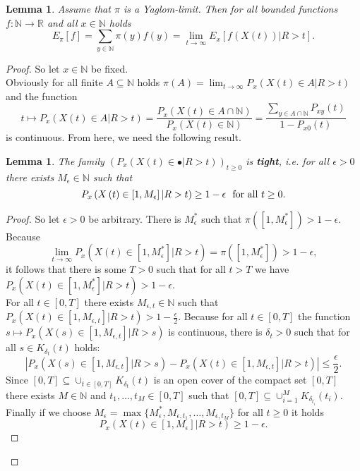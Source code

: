 \documentclass[12pt,a4paper]{scrartcl}
\newtheorem{lemma}[theorem]{Lemma}
\numberwithin{equation}{section}
\newcommand{\R}{\mathbb{R}} %
\newcommand{\N}{\mathbb{N}} %
\begin{document}
\begin{lemma} \label{extensionyaylom}
Assume that $\pi$ is a Yaglom-limit. Then for all bounded functions $f:\N \to \R$ and all $x \in \N$ holds
$$ E_{\pi}\left[f\right] = \sum_{y \in \N} \pi\left(y\right) f\left(y\right) = \lim_{t \to \infty} E_x\left[ f\left(X\left(t\right) \right) | R > t \right]. $$
\end{lemma}
\begin{proof}
So let $x \in \N$ be fixed.\\ 
Obviously for all finite $A \subseteq \N$ holds $\pi\left(A\right) = \lim_{t \to \infty} P_x\left(X\left(t\right) \in A | R > t \right)$ and the function
$$ t \mapsto P_x\left(X\left(t\right) \in A | R > t \right) = \frac{P_x\left(X\left(t\right) \in A \cap \N \right)}{P_x\left(X\left(t\right) \in \N \right)} = \frac{\sum_{y \in A \cap \N} P_{xy}\left(t\right) }{1-P_{x0}\left(t\right)}$$
is continuous. From here, we need the following result.
\begin{lemma}
The family $\left( P_x\left(X\left(t\right) \in \bullet | R > t \right) \right)_{t \geq 0}$ is \textbf{tight}, i.e. for all $\epsilon > 0$ there exists $ M_{\epsilon} \in \N $ such that
$$ P_x\left( X\left(t\right) \in \left[1, M_{\epsilon} \right] | R > t \right)  \geq 1 - \epsilon \ \ \textnormal{for all } t \geq 0.$$
\end{lemma}
\begin{proof}
So let $\epsilon > 0$ be arbitrary. There is $M_{\epsilon}^{\ast}$ such that $\pi\left(\left[1, M_{\epsilon}^{\ast}\right] \right) > 1 - \epsilon.$ Because 
$$ \lim_{t \to \infty} P_x\left(X\left(t\right) \in \left[1, M_{\epsilon}^{\ast} \right] | R > t\right) = \pi\left(\left[1, M_{\epsilon}^{\ast}\right] \right) > 1 - \epsilon, $$
it follows that there is some $T > 0$ such that for all $ t > T $ we have $ P_x\left(X\left(t\right) \in \left[1, M_{\epsilon}^{\ast}\right] | R > t \right) > 1 - \epsilon. $ \\
For all $t \in \left[0, T\right]$ there exists $M_{\epsilon, t} \in \N$ such that $ P_x\left(X\left(t\right) \in \left[1, M_{\epsilon, t} \right] | R > t \right) > 1- \frac{\epsilon}{2}. $ Because for all $ t \in \left[0,T\right] $ the function $ s \mapsto P_x\left(X\left(s\right) \in \left[1 , M_{\epsilon, t} \right] | R > s\right)$ is continuous, there is $\delta_t > 0$ such that for all $ s \in K_{\delta_t}\left(t\right) $ holds:
$$ \left| P_x\left(X\left(s\right) \in \left[1, M_{\epsilon, t} \right] | R > s\right) - P_x\left(X\left(t\right) \in \left[1, M_{\epsilon, t} \right] | R > t\right) \right| \leq \frac{\epsilon}{2}. $$
Since $\left[0,T\right] \subseteq \cup_{t \in \left[0,T\right]} K_{\delta_t}\left(t\right)$ is an open cover of the compact set $\left[0,T\right]$ there exists $M \in \N$ and $t_1, \ldots , t_M \in \left[0, T\right]$ such that $\left[0, T \right] \subseteq \cup_{i=1}^M K_{\delta_{t_i}}\left(t_i\right).$
Finally if we choose $M_{\epsilon} = \max\lbrace M_{\epsilon}^{\ast}, M_{\epsilon, t_1}, \ldots , M_{\epsilon, t_M}  \rbrace$ for all $t \geq 0$ it holds
$$ P_x\left(X\left(t\right) \in \left[1,M_{\epsilon} \right] | R > t \right)  \geq 1- \epsilon.$$
\end{proof}


\end{proof}
\end{document}

